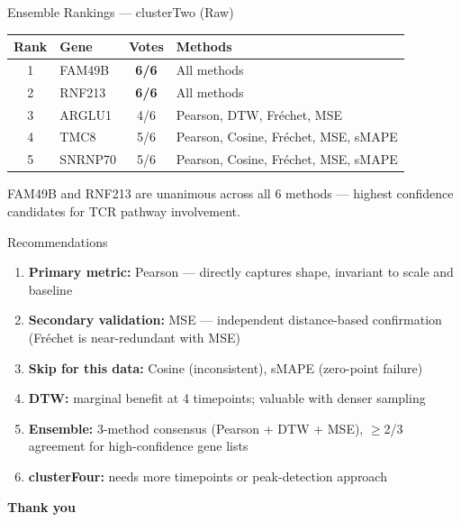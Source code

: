 \documentclass[aspectratio=169,12pt,handout]{beamer}
\begin{document}
\begin{frame}{Ensemble Rankings --- clusterTwo (Raw)}
\small
\begin{center}
\begin{tabular}{clcl}
\toprule
\textbf{Rank} & \textbf{Gene} & \textbf{Votes} & \textbf{Methods} \\
\midrule
1 & FAM49B  & \textbf{6/6} & All methods \\
2 & RNF213  & \textbf{6/6} & All methods \\
3 & ARGLU1  & 4/6 & Pearson, DTW, Fr\'{e}chet, MSE \\
4 & TMC8    & 5/6 & Pearson, Cosine, Fr\'{e}chet, MSE, sMAPE \\
5 & SNRNP70 & 5/6 & Pearson, Cosine, Fr\'{e}chet, MSE, sMAPE \\
\bottomrule
\end{tabular}
\end{center}

\vspace{0.5em}
FAM49B and RNF213 are unanimous across all 6 methods --- highest confidence
candidates for TCR pathway involvement.
\end{frame}

\begin{frame}{Recommendations}
\begin{enumerate}
  \item \textbf{Primary metric:} Pearson --- directly captures shape, invariant
        to scale and baseline
  \item \textbf{Secondary validation:} MSE --- independent distance-based
        confirmation (Fr\'{e}chet is near-redundant with MSE)
  \item \textbf{Skip for this data:} Cosine (inconsistent), sMAPE (zero-point failure)
  \item \textbf{DTW:} marginal benefit at 4 timepoints; valuable with denser sampling
  \item \textbf{Ensemble:} 3-method consensus (Pearson + DTW + MSE), $\geq$2/3 agreement
        for high-confidence gene lists
  \item \textbf{clusterFour:} needs more timepoints or peak-detection approach
\end{enumerate}
\end{frame}

\begin{frame}{}
\vfill
\centering
\textbf{\Huge Thank you}
\vfill
\end{frame}
\end{document}
